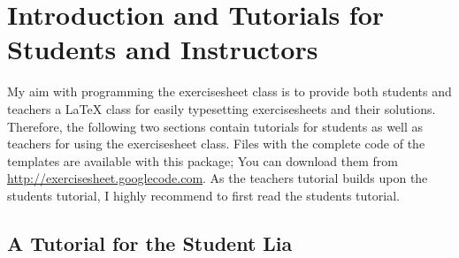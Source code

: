 \documentclass[a4paper,fleqn,9pt]{report}
\let\sffamily=\rmfamily
\def\exercisesheet{{exercisesheet}}
\begin{document}

\begin{abstract}
  The \exercisesheet{} class provides a convenient way to produce
  hiqh-quality exercise sheets for both students and instructors. This
  is the official reference manual. It contains tutorials for students
  and instructors that explain the first steps in using this class.
  Moreover, a complete list of the commands defined by the
  \exercisesheet{} class is contained.
\end{abstract}

\tableofcontents

\chapter{Introduction and Tutorials for Students and Instructors}

My aim with programming the \exercisesheet{} class is to provide both
students and teachers a \LaTeX{} class for easily typesetting
exercisesheets and their solutions. Therefore, the following two
sections contain tutorials for students as well as teachers for using
the \exercisesheet{} class. Files with the complete code of the
templates are available with this package; You can download them from
\url{http://exercisesheet.googlecode.com}. As the teachers tutorial
builds upon the students tutorial, I highly recommend to first read
the students tutorial.

\section{A Tutorial for the Student Lia}
\end{document}
